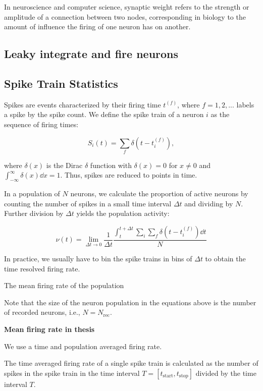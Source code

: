 In neuroscience and computer science, synaptic weight refers to the strength or amplitude of a connection between two nodes, corresponding in biology to the amount of influence the firing of one neuron has on another.

\subsection{Leaky integrate and fire neurons}

\subsection{Spike Train Statistics}

Spikes are events characterized by their firing time $t^{(f)}$, where $f=1, 2, ...$ labels a spike by the spike count. We define the spike train of a neuron $i$ as the sequence of firing times: 

\begin{equation}
    S_i(t) = \sum_f \delta \left(t - t_i^{(f)} \right),
\end{equation}

where $\delta(x)$ is the Dirac $\delta$ function with $\delta(x)=0$ for $x \neq 0$ and $\int_{-\infty}^\infty \delta (x) \dd{x} = 1$. Thus, spikes are reduced to points in time. 

In a population of $N$ neurons, we calculate the proportion of active neurons by counting the number of spikes in a small time interval $\Delta t$ and dividing by $N$. Further division by $\Delta t$ yields the population activity:

\begin{equation}
    \nu (t) = \lim_{\Delta t \to 0} \frac{1}{\Delta t} \frac{\int_{t}^{t + \Delta t} \sum_i \sum_f \delta \left(t - t_i^{(f)} \right) \dd{t}}{N}
\end{equation} 

In practice, we usually have to bin the spike trains in bins of $\Delta t$ to obtain the time resolved firing rate. 

The mean firing rate of the population  


Note that the size of the neuron population in the equations above is the number of recorded neurons, i.e., $N = N_\mathrm{rec}$.

\textbf{Mean firing rate in thesis}

We use a time and population averaged firing rate. 

The time averaged firing rate of a single spike train is calculated as the number of spikes in the spike train in the time interval $T = [t_\mathrm{start}, t_\mathrm{stop}]$ divided by the time interval $T$. 

